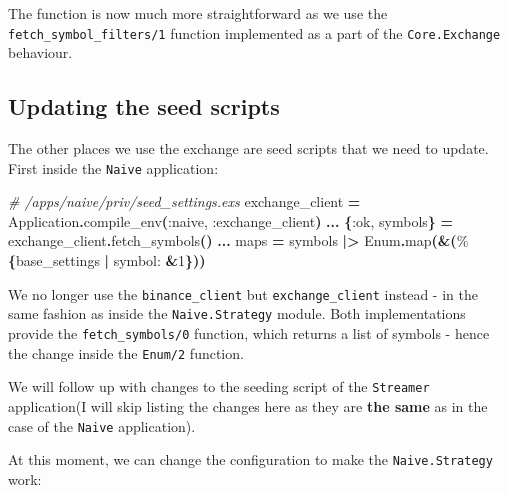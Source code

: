 \documentclass[
  oneside]{book}
\newenvironment{Shaded}{\begin{snugshade}}{\end{snugshade}}
\newcommand{\CommentTok}[1]{\textcolor[rgb]{0.56,0.35,0.01}{\textit{#1}}}
\newcommand{\ConstantTok}[1]{\textcolor[rgb]{0.56,0.35,0.01}{#1}}
\newcommand{\DecValTok}[1]{\textcolor[rgb]{0.00,0.00,0.81}{#1}}
\newcommand{\FunctionTok}[1]{\textcolor[rgb]{0.13,0.29,0.53}{\textbf{#1}}}
\newcommand{\NormalTok}[1]{#1}
\newcommand{\OperatorTok}[1]{\textcolor[rgb]{0.81,0.36,0.00}{\textbf{#1}}}
\newcommand{\VariableTok}[1]{\textcolor[rgb]{0.00,0.00,0.00}{#1}}
\begin{document}
The function is now much more straightforward as we use the \texttt{fetch\_symbol\_filters/1} function implemented as a part of the \texttt{Core.Exchange} behaviour.

\newpage

\subsection{Updating the seed scripts}\label{updating-the-seed-scripts}

The other places we use the exchange are seed scripts that we need to update. First inside the \texttt{Naive} application:

\begin{Shaded}
\begin{Highlighting}[]
\CommentTok{\# /apps/naive/priv/seed\_settings.exs}
\NormalTok{exchange\_client }\OperatorTok{=} \ConstantTok{Application}\OperatorTok{.}\NormalTok{compile\_env}\FunctionTok{(}\VariableTok{:naive}\NormalTok{, }\VariableTok{:exchange\_client}\FunctionTok{)}
\OperatorTok{...}
\FunctionTok{\{}\VariableTok{:ok}\NormalTok{, symbols}\FunctionTok{\}} \OperatorTok{=}\NormalTok{ exchange\_client}\OperatorTok{.}\NormalTok{fetch\_symbols}\FunctionTok{()}
\OperatorTok{...}
\NormalTok{maps }\OperatorTok{=}\NormalTok{ symbols}
  \OperatorTok{|\textgreater{}} \ConstantTok{Enum}\OperatorTok{.}\NormalTok{map}\FunctionTok{(}\OperatorTok{\&}\FunctionTok{(}\NormalTok{\%}\FunctionTok{\{}\NormalTok{base\_settings }\OperatorTok{|} \VariableTok{symbol:} \OperatorTok{\&}\DecValTok{1}\FunctionTok{\}))}
\end{Highlighting}
\end{Shaded}

We no longer use the \texttt{binance\_client} but \texttt{exchange\_client} instead - in the same fashion as inside the \texttt{Naive.Strategy} module. Both implementations provide the \texttt{fetch\_symbols/0} function, which returns a list of symbols - hence the change inside the \texttt{Enum/2} function.

We will follow up with changes to the seeding script of the \texttt{Streamer} application(I will skip listing the changes here as they are \textbf{the same} as in the case of the \texttt{Naive} application).

At this moment, we can change the configuration to make the \texttt{Naive.Strategy} work:
\end{document}
